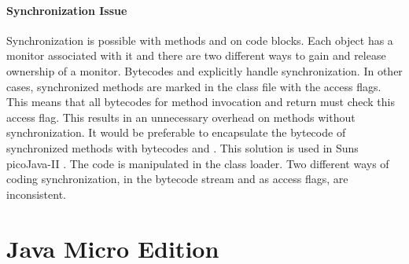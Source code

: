 \paragraph{Synchronization Issue}

Synchronization is possible with methods and on code blocks. Each
object has a monitor associated with it and there are two different
ways to gain and release ownership of a monitor. Bytecodes
 and  explicitly handle
synchronization. In other cases, synchronized methods are marked in
the class file with the access flags. This means that all bytecodes
for method invocation and return must check this access flag. This
results in an unnecessary overhead on methods without
synchronization. It would be preferable to encapsulate the bytecode
of synchronized methods with bytecodes  and
. This solution is used in Suns picoJava-II
\cite{pjProgRef}. The code is manipulated in the class loader. Two
different ways of coding synchronization, in the bytecode stream and
as access flags, are inconsistent.

\section{Java Micro Edition}
\label{sec:j2me}

